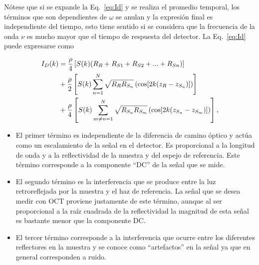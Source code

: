 Nótese que si se expande la Eq.~\ref{eq:Id} y se realiza el promedio temporal, los términos que son dependientes de $\omega$ se anulan y la expresión final es independiente del tiempo, esto tiene sentido si se considera que la frecuencia de la onda $\nu$ es mucho mayor que el tiempo de respuesta del detector. La Eq.~\ref{eq:Id} puede expresarse como

%
%

\begin{align}
\label{eq:ID_fin}
I_D(k) &= \frac{\rho}{4}\left[ S(k) (R_R + R_{S1} + R_{S2} + ...+R_{Sn}) \right] \notag \\
& + \frac{\rho}{2} \left[ S(k) \sum_{n=1}^{N} \sqrt{R_R R_{S_n}} \left( \cos[2k(z_R - z_{S_n})] \right) \right] \\
& + \frac{\rho}{4} \left[ S(k) \sum_{m\neq n=1}^{N} \sqrt{R_{S_n}R_{S_m}} \left( \cos[2k(z_{S_n} - z_{S_m})] \right) \right], \notag
\end{align}


\begin{itemize}
	\item El primer término es independiente de la diferencia de camino óptico y actúa como un escalamiento de la señal en el detector. Es proporcional a la longitud de onda y a la reflectividad de la muestra y del espejo de referencia. Este término corresponde a la componente ``DC'' de la señal que se mide.
	\item El segundo término es la interferencia  que se produce entre la luz retroreflejada por la muestra y el haz de referencia. La señal que se desea medir con OCT proviene justamente de este término, aunque al ser proporcional a la raíz cuadrada de la reflectividad la magnitud de esta señal es bastante menor que la componente DC.
	\item El tercer término corresponde a la interferencia que ocurre entre los diferentes reflectores en la muestra y se conoce como ``artefactos'' en la señal ya que en general corresponden a ruido.
\end{itemize}

